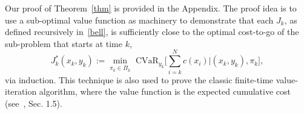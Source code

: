\documentclass[letterpaper, 10 pt, conference]{ieeeconf}  %
\begin{document}
Our proof of Theorem~\ref{thm} is provided in the Appendix.
The proof idea is to use a sub-optimal value function as machinery to demonstrate that each $J_k$, as defined recursively in~\eqref{bell},
is sufficiently close to the optimal cost-to-go of the sub-problem that starts at time $k$,
\begin{equation}
J_k^*(x_k, y_k) := {\underset{\pi_k \in \bar{\Pi}_k}\min} \text{ CVaR}_{y_k} \big[ \textstyle\sum_{i=k}^N c(x_i) \big| (x_k, y_k), \pi_k \big],
\label{Jkstar}\end{equation}
via induction. This technique is also used to prove the classic finite-time value-iteration algorithm, 
where the value function is the expected cumulative cost (see~\cite{bertsekas2005dynamic}, Sec. 1.5).
%
%
\end{document}
